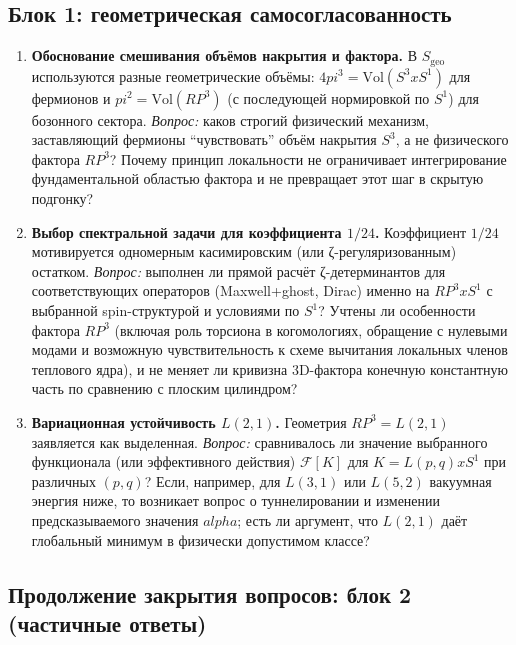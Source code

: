 \documentclass[12pt]{article}
\def\mathbb#1{#1}%
\def\alpha{alpha}%
\def\pi{pi}%
\def\times{x}%
\begin{document}
\subsection{Блок 1: геометрическая самосогласованность}
\begin{enumerate}
  \item \textbf{Обоснование смешивания объёмов накрытия и фактора.}
  В $S_{\mathrm{geo}}$ используются разные геометрические объёмы: $4\pi^3=\mathrm{Vol}(S^3\times S^1)$ для фермионов и $\pi^2=\mathrm{Vol}(\mathbb{RP}^3)$ (с последующей нормировкой по $S^1$) для бозонного сектора.
  \emph{Вопрос:} каков строгий физический механизм, заставляющий фермионы ``чувствовать'' объём накрытия $S^3$, а не физического фактора $\mathbb{RP}^3$? Почему принцип локальности не ограничивает интегрирование фундаментальной областью фактора и не превращает этот шаг в скрытую подгонку?

  \item \textbf{Выбор спектральной задачи для коэффициента $1/24$.}
  Коэффициент $1/24$ мотивируется одномерным касимировским (или ζ-регуляризованным) остатком.
  \emph{Вопрос:} выполнен ли прямой расчёт ζ-детерминантов для соответствующих операторов (Maxwell+ghost, Dirac) именно на $\mathbb{RP}^3\times S^1$ с выбранной spin-структурой и условиями по $S^1$? Учтены ли особенности фактора $\mathbb{RP}^3$ (включая роль торсиона в когомологиях, обращение с нулевыми модами и возможную чувствительность к схеме вычитания локальных членов теплового ядра), и не меняет ли кривизна 3D-фактора конечную константную часть по сравнению с плоским цилиндром?

  \item \textbf{Вариационная устойчивость $L(2,1)$.}
  Геометрия $\mathbb{RP}^3=L(2,1)$ заявляется как выделенная.
  \emph{Вопрос:} сравнивалось ли значение выбранного функционала (или эффективного действия) $\mathcal{F}[K]$ для $K=L(p,q)\times S^1$ при различных $(p,q)$? Если, например, для $L(3,1)$ или $L(5,2)$ вакуумная энергия ниже, то возникает вопрос о туннелировании и изменении предсказываемого значения $\alpha$; есть ли аргумент, что $L(2,1)$ даёт глобальный минимум в физически допустимом классе?
\end{enumerate}

\subsection*{Продолжение закрытия вопросов: блок 2 (частичные ответы)}
\end{document}
